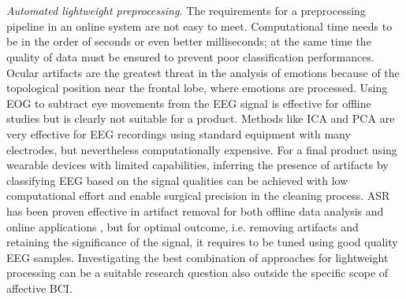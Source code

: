 \\
\\
\emph{Automated lightweight preprocessing.} The requirements for a preprocessing pipeline in an online system are not easy to meet. Computational time needs to be in the order of seconds or even better milliseconds; at the same time the quality of data must be ensured to prevent poor classification performances. Ocular artifacts are the greatest threat in the analysis of emotions because of the topological position near the frontal lobe, where emotions are processed. Using \ac{EOG} to subtract eye movements from the EEG signal is effective for offline studies but is clearly not suitable for a product. Methods like \ac{ICA} and \ac{PCA} are very effective for \ac{EEG} recordings using standard equipment with many electrodes, but nevertheless computationally expensive. For a final product using wearable devices with limited capabilities, inferring the presence of artifacts by classifying \ac{EEG} based on the signal qualities \cite{grosselin_quality_2019} can be achieved with low computational effort and enable surgical precision in the cleaning process. \ac{ASR} has been proven effective in artifact removal for both offline data analysis and online applications \cite{chang_evaluation_2018}, but for optimal outcome, i.e. removing artifacts and retaining the significance of the signal, it requires to be tuned using good quality \ac{EEG} samples. Investigating the best combination of approaches for lightweight processing can be a suitable research question also outside the specific scope of affective \ac{BCI}.
\\
\\
